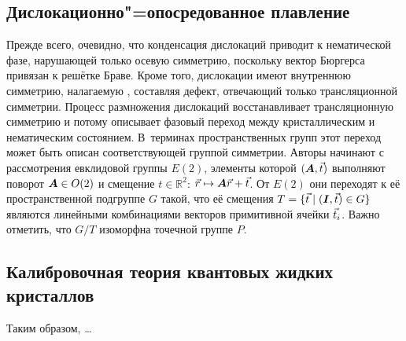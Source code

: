 \documentclass[a4paper, 14pt, titlepage]{extarticle}
\newcommand{\R}{\mathbb{R}}  %
\begin{document}
  \subsection{Дислокационно"=опосредованное плавление}

  Прежде всего, очевидно, что конденсация дислокаций приводит к нематической фазе, нарушающей только
  осевую симметрию, поскольку вектор Бюргерса привязан к решётке Браве. Кроме того, дислокации имеют
  внутреннюю симметрию, налагаемую , составляя дефект, отвечающий
  только трансляционной симметрии. Процесс размножения дислокаций восстанавливает трансляционную
  симметрию и потому описывает фазовый переход между кристаллическим и нематическим состоянием.
  В~терминах пространственных групп этот переход может быть описан соответствующей группой симметрии.
  Авторы начинают с рассмотрения евклидовой группы $E(2)$, элементы которой $(\bm{A},\vec{t})$
  выполняют поворот $\bm{A} \in O(2)$ и смещение $t \in \R^2$: $\vec{r} \mapsto \bm{A}\vec{r} + \vec{t}$.
  От $E(2)$ они переходят к её пространственной подгруппе $G$ такой, что её смещения
  $T = \{\vec{t} \mid (\bm{I},\vec{t}) \in G\}$ являются линейными комбинациями векторов
  примитивной ячейки $\vec{t}_i$. Важно отметить, что $G/T$ изоморфна точечной группе $P$.

  \subsection{Калибровочная теория квантовых жидких кристаллов}


  Таким образом, \dots

  \PrintBibliography
\end{document}
